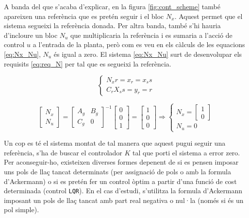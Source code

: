 \documentclass[12pt,a4paper,final,twoside,openright]{report}
\begin{document}
A banda del que s'acaba d'explicar, en la figura \ref{fig:cont_scheme} també apareixen una referència que es pretén seguir i el bloc $N_x$. Aquest permet que el sistema segueixi la referència donada. Per altra banda, també s'hi hauria d'incloure un bloc $N_u$ que multiplicaria la referència i es sumaria a l'acció de control $u$ a l'entrada de la planta, però com es veu en els càlculs de les equacions \eqref{eq:Nx_Nu}, $N_u$ és igual a zero. El sistema \eqref{eq:Nx_Nu} surt de desenvolupar els requisits \eqref{eq:req_N} per tal que es segueixi la referència. 

\begin{equation}\label{eq:req_N}
\left\{
\begin{array}{lr}
N_x r = x_r = x_ss \\
C_r X_ss = y_r = r
\end{array}
\right.
\end{equation}

\begin{equation}\label{eq:Nx_Nu}
\begin{bmatrix}
N_x\\
N_u
\end{bmatrix}
=
\begin{bmatrix}
A_g & B_g\\
C_g & 0
\end{bmatrix}^{-1}
\begin{bmatrix}
0\\
0\\
1
\end{bmatrix}
=
\begin{bmatrix}
1\\
0\\
0
\end{bmatrix}
\Rightarrow \left\{
\begin{array}{lr}
N_x = \begin{bmatrix}
1\\
0
\end{bmatrix} \\
N_u = 0
\end{array}
\right.
\end{equation}

Un cop es té el sistema montat de tal manera que aquest pugui seguir una referència, s'ha de buscar el controlador $K$ tal que porti el sistema a error zero. Per aconseguir-ho, existeixen diverses formes depenent de si es pensen imposar uns pols de llaç tancat determinats (per assignació de pols o amb la formula d'Ackermann) o si es pretén fer un control òptim a partir d'una funció de cost determinada (control \texttt{LQR}). En el cas d'estudi, s'utilitza la formula d'Ackermann imposant un pols de llaç tancat amb part real negativa o nul·la (només si és un pol simple).
\end{document}
